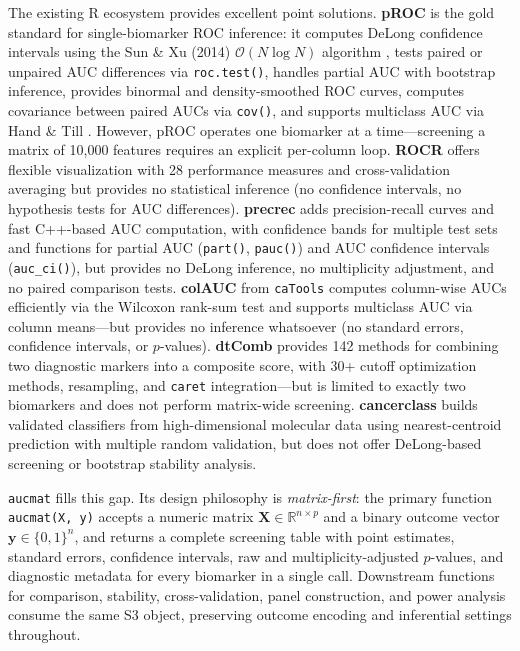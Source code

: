 \documentclass[11pt,a4paper]{article}
\begin{document}
The existing R ecosystem provides excellent point solutions.  \textbf{pROC}
\citep{Robin2011} is the gold standard for single-biomarker ROC inference:
it computes DeLong confidence intervals using the Sun \& Xu (2014)
$\mathcal{O}(N \log N)$ algorithm \citep{Sun2014}, tests paired or unpaired
AUC differences via \texttt{roc.test()}, handles partial AUC with bootstrap
inference, provides binormal and density-smoothed ROC curves, computes
covariance between paired AUCs via \texttt{cov()}, and supports multiclass
AUC via Hand \& Till \citep{Hand2001}.  However, pROC operates one biomarker
at a time---screening a matrix of 10{,}000 features requires an explicit
per-column loop.  \textbf{ROCR} \citep{Sing2005} offers flexible
visualization with 28 performance measures and cross-validation averaging
but provides no statistical inference (no confidence intervals, no hypothesis
tests for AUC differences).  \textbf{precrec} \citep{Saito2017} adds
precision-recall curves and fast C++-based AUC computation, with confidence
bands for multiple test sets and functions for partial AUC
(\texttt{part()}, \texttt{pauc()}) and AUC confidence intervals
(\texttt{auc\_ci()}), but provides no DeLong inference, no multiplicity
adjustment, and no paired comparison tests.  \textbf{colAUC} from
\texttt{caTools} \citep{Tuszynski2024} computes column-wise AUCs efficiently
via the Wilcoxon rank-sum test and supports multiclass AUC via column
means---but provides no inference whatsoever (no standard errors, confidence
intervals, or $p$-values).  \textbf{dtComb} \citep{Yerlitas2025} provides
142 methods for combining two diagnostic markers into a composite score,
with 30+ cutoff optimization methods, resampling, and \texttt{caret}
integration---but is limited to exactly two biomarkers and does not perform
matrix-wide screening.  \textbf{cancerclass} \citep{Budczies2024} builds
validated classifiers from high-dimensional molecular data using
nearest-centroid prediction with multiple random validation, but does not
offer DeLong-based screening or bootstrap stability analysis.

\texttt{aucmat} fills this gap.  Its design philosophy is
\textit{matrix-first}: the primary function \texttt{aucmat(X, y)} accepts a
numeric matrix $\mathbf{X} \in \mathbb{R}^{n \times p}$ and a binary outcome
vector $\mathbf{y} \in \{0,1\}^n$, and returns a complete screening table
with point estimates, standard errors, confidence intervals, raw and
multiplicity-adjusted $p$-values, and diagnostic metadata for every biomarker
in a single call.  Downstream functions for comparison, stability,
cross-validation, panel construction, and power analysis consume the same S3
object, preserving outcome encoding and inferential settings throughout.
\end{document}
